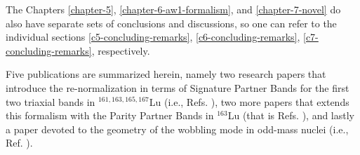 The Chapters \ref{chapter-5}, \ref{chapter-6-aw1-formalism}, and \ref{chapter-7-novel} do also have separate sets of conclusions and discussions, so one can refer to the individual sections \ref{c5-concluding-remarks}, \ref{c6-concluding-remarks}, \ref{c7-concluding-remarks}, respectively.

Five publications are summarized herein, namely two research papers that introduce the re-normalization in terms of Signature Partner Bands for the first two triaxial bands in $^{161,163,165,167}$Lu (i.e., Refs. \cite{raduta2020approach,raduta2020towards}), two more papers that extends this formalism with the Parity Partner Bands in $^{163}$Lu (that is Refs. \cite{poenaru2021parity,poenaru2021extensive1}), and lastly a paper devoted to the geometry of the wobbling mode in odd-mass nuclei (i.e., Ref. \cite{poenaru2021extensive2}).